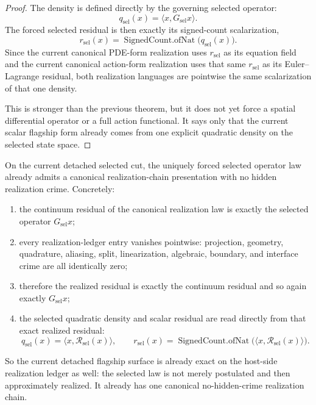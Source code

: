 \begin{proof}
The density is defined directly by the governing selected operator:
\[
q_{\mathrm{sel}}(x)=\langle x,G_{\mathrm{sel}}x\rangle.
\]
The forced selected residual is then exactly its signed-count scalarization,
\[
r_{\mathrm{sel}}(x)=\operatorname{SignedCount.ofNat}\!\bigl(q_{\mathrm{sel}}(x)\bigr).
\]
Since the current canonical PDE-form realization uses \(r_{\mathrm{sel}}\) as
its equation field and the current canonical action-form realization uses that
same \(r_{\mathrm{sel}}\) as its Euler--Lagrange residual, both realization
languages are pointwise the same scalarization of that one density.

This is stronger than the previous theorem, but it does not yet
force a spatial differential operator or a full action functional. It says
only that the current scalar flagship form already comes from one explicit
quadratic density on the selected state space.
\end{proof}

\begin{theorem}
\label{thm:the-selected-operator-law-already-has-a-canonical-no-hidden-crime-realization-ledger}
On the current detached selected cut, the uniquely forced selected operator law
already admits a canonical realization-chain presentation with no hidden
realization crime. Concretely:
\begin{enumerate}
\item the continuum residual of the canonical realization law is exactly the
      selected operator \(G_{\mathrm{sel}}x\);
\item every realization-ledger entry vanishes pointwise: projection, geometry,
      quadrature, aliasing, split, linearization, algebraic, boundary, and
      interface crime are all identically zero;
\item therefore the realized residual is exactly the continuum residual and so
      again exactly \(G_{\mathrm{sel}}x\);
\item the selected quadratic density and scalar residual are read directly from
      that exact realized residual:
\[
q_{\mathrm{sel}}(x)
  =\langle x,\mathcal R_{\mathrm{sel}}(x)\rangle,
\qquad
r_{\mathrm{sel}}(x)
  =\operatorname{SignedCount.ofNat}\!\bigl(\langle x,\mathcal R_{\mathrm{sel}}(x)\rangle\bigr).
\]
\end{enumerate}
So the current detached flagship surface is already exact on the host-side
realization ledger as well: the selected law is not merely postulated and then
approximately realized. It already has one canonical no-hidden-crime
realization chain.
\end{theorem}

